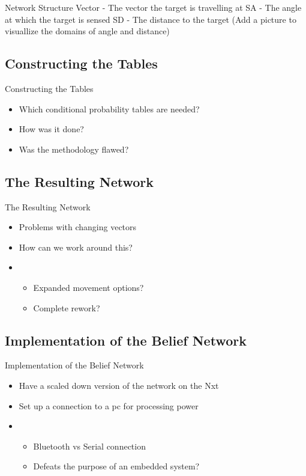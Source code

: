 \begin{frame}{Network Structure}
Vector - The vector the target is travelling at
SA - The angle at which the target is sensed
SD - The distance to the target
(Add a picture to visuallize the domains of angle and distance)
\end{frame}

\subsection{Constructing the Tables}
\begin{frame}{Constructing the Tables}
\begin{itemize}
\item Which conditional probability tables are needed?
\item How was it done? 
\item Was the methodology flawed?
\end{itemize}
\end{frame}


\subsection{The Resulting Network}
\begin{frame}{The Resulting Network}
\begin{itemize}
\item Problems with changing vectors
\item How can we work around this?
\item \begin{itemize}
  \item Expanded movement options?
  \item Complete rework?
  \end{itemize}
\end{itemize}
\end{frame}


\subsection{Implementation of the Belief Network}
\begin{frame}{Implementation of the Belief Network}
\begin{itemize}
\item Have a scaled down version of the network on the Nxt
\item Set up a connection to a pc for processing power
\item \begin{itemize}
   \item Bluetooth vs Serial connection
   \item Defeats the purpose of an embedded system?
   \end{itemize}
\end{itemize}
\end{frame}
